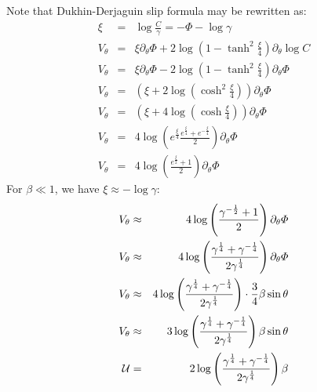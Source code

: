 Note that Dukhin-Derjaguin slip formula may be rewritten as:
\begin{eqnarray}
  \xi &=& \log \frac{C}{\gamma} = -\varPhi - \log\gamma \\
  V_\theta & = & \xi \partial_\theta \varPhi
  + 2 \log\left(1 - \tanh^2 \frac{\xi}{4}\right) \partial_\theta \log C \\
  V_\theta & = & \xi \partial_\theta \varPhi
  - 2 \log\left(1 - \tanh^2 \frac{\xi}{4}\right) \partial_\theta \varPhi
  \\ V_\theta & = & \left( \xi + 2 \log\left(\cosh^2 \frac{\xi}{4}\right) \right) \partial_\theta \varPhi
  \\ V_\theta & = & \left( \xi + 4 \log\left(\cosh \frac{\xi}{4}\right) \right) \partial_\theta \varPhi
  \\ V_\theta & = & 4 \log\left(e^\frac{\xi}{4} \frac{ e^\frac{\xi}{4} + e^{-\frac{\xi}{4}} }{2} \right) \partial_\theta \varPhi
  \\ V_\theta & = & 4 \log\left( \frac{ e^\frac{\xi}{2} + 1 }{2} \right) \partial_\theta \varPhi
\end{eqnarray}
For $\beta \ll 1$, we have $\xi \approx -\log\gamma$:
\begin{eqnarray}
  V_\theta & \approx & 4 \log\left( \frac{ \gamma^{-\frac{1}{2}} + 1 }{2} \right) \partial_\theta \varPhi \\
  V_\theta & \approx & 4 \log\left( \frac{ \gamma^{\frac{1}{4}} + \gamma^{-\frac{1}{4}} }{2 \gamma^{\frac{1}{4}}} \right) \partial_\theta \varPhi \\
  V_\theta & \approx & 4 \log\left( \frac{ \gamma^{\frac{1}{4}} + \gamma^{-\frac{1}{4}} }{2 \gamma^{\frac{1}{4}}} \right) \cdot \frac{3}{4} \beta \sin\theta \\
  V_\theta & \approx & 3 \log\left( \frac{ \gamma^{\frac{1}{4}} + \gamma^{-\frac{1}{4}} }{2 \gamma^{\frac{1}{4}}} \right) \beta \sin\theta \\
  \cal{U} &=& 2 \log\left( \frac{ \gamma^{\frac{1}{4}} + \gamma^{-\frac{1}{4}} }{2 \gamma^{\frac{1}{4}}} \right) \beta
\end{eqnarray}